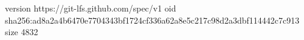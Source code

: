 version https://git-lfs.github.com/spec/v1
oid sha256:ad8a2a4b6470e7704343bf1724cf336a62a8e5c217c98d2a3dbf114442c7c913
size 4832
